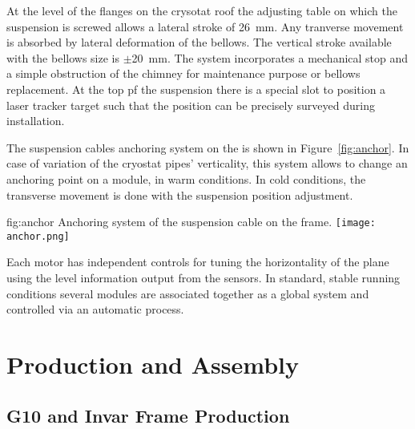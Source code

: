 At the level of the flanges on the crysotat roof the adjusting table on which the suspension \fdth is screwed allows a lateral stroke of \SI{26}{mm}. Any tranverse movement is absorbed by lateral deformation of the bellows.
The vertical stroke available with the bellows size is $\pm$\SI{20}{mm}.
The system incorporates a  mechanical stop and a simple obstruction of the chimney for maintenance purpose or bellows replacement.
At the top pf the suspension \fdth there is a special slot to position a laser tracker target
such that the \fdth position can be precisely surveyed during installation.

The suspension cables anchoring system on the  is shown in Figure~\ref{fig:anchor}. 
In case of variation of the cryostat pipes' verticality, this system allows to change an anchoring point on a module, in warm conditions. In cold conditions, the transverse movement is done with the suspension \fdth position adjustment.
\begin{dunefigure}{fig:anchor}
{Anchoring system of the suspension cable on the  frame.}
\texttt{[image: anchor.png]}
\end{dunefigure}

Each motor has independent controls for tuning the horizontality of the plane using the  level information output from the %
sensors. In standard, stable running  conditions several  modules are associated together as a global system and controlled via an automatic process.



\section{Production and Assembly}
\label{sec:fddp-crp-prod-assy}

\subsection{G10 and Invar Frame Production}
\label{sec:fddp-crp-frame}

